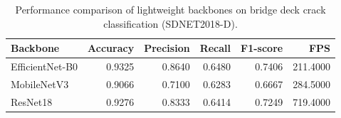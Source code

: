\begin{table}
\caption{Performance comparison of lightweight backbones on bridge deck crack classification (SDNET2018-D).}
\label{tab:backbone}
\begin{tabular}{lrrrrr}
\toprule
Backbone & Accuracy & Precision & Recall & F1-score & FPS \\
\midrule
EfficientNet-B0 & 0.9325 & 0.8640 & 0.6480 & 0.7406 & 211.4000 \\
MobileNetV3 & 0.9066 & 0.7100 & 0.6283 & 0.6667 & 284.5000 \\
ResNet18 & 0.9276 & 0.8333 & 0.6414 & 0.7249 & 719.4000 \\
\bottomrule
\end{tabular}
\end{table}
